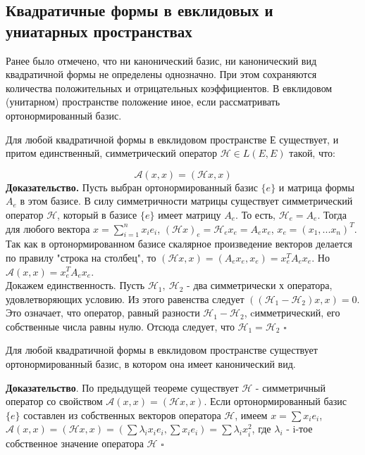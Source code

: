 \subsection{Квадратичные формы в евклидовых и униатарных пространствах}
Ранее было отмечено, что ни канонический базис, ни канонический вид 
квадратичной формы не определены однозначно. При этом сохраняются количества 
положительных и отрицательных коэффициентов. В евклидовом (унитарном) 
пространстве положение иное, если рассматривать ортонормированный базис. 
\begin{theor}
Для любой квадратичной формы в евклидовом пространстве Е существует, и притом
единственный, симметрический оператор $\mathcal H\in L(E,E)$ такой, что:
\end{theor}
$$\mathcal A(x,x)=(\mathcal Hx,x)$$
\textbf{Доказательство.} Пусть выбран ортонормированный базис $\{e\}$ и
матрица формы $A_e$ в этом базисе. В силу
симметричности матрицы существует симметрический оператор $\mathcal H$, 
который в базисе $\{e\}$ имеет матрицу $A_e$. То есть, $\mathcal H_e=A_e$. 
Тогда для любого
вектора $x=\sum\limits_{i=1}^nx_ie_i$, 
$(\mathcal Hx)_e=\mathcal H_ex_e=A_ex_e$,
$x_e=(x_1,...x_n)^T$. Так как в ортонормированном базисе скалярное 
произведение векторов делается по правилу "строка на столбец", то $(\mathcal
Hx,x)=(A_ex_e,x_e)=x_e^TA_ex_e$. Но $\mathcal A(x,x)=x_e^TA_ex_e$. \\
Докажем единственность. Пусть $\mathcal H_1,~\mathcal H_2$ - два симметрически
х оператора, удовлетворяющих условию. Из этого равенства следует $((\mathcal
H_1-\mathcal H_2)x,x)=0$. Это означает, что оператор, равный разности
$\mathcal H_1-\mathcal H_2$, cимметрический, его собственные числа равны нулю.
Отсюда следует, что $\mathcal H_1=\mathcal H_2$ $\square$
\begin{theor}\label{privglavos}
Для любой квадратичной формы в евклидовом пространстве существует 
ортонормированный базис, в котором она имеет канонический вид. 
\end{theor}
\textbf{Доказательство}. По предыдущей теореме существует $\mathcal H$ - 
симметричный оператор со свойством $\mathcal A(x,x)=(\mathcal Hx,x)$. Если
ортонормированный базис $\{e\}$ составлен из собственных векторов оператора
$\mathcal H$, имеем $x=\sum x_ie_i$, $\mathcal A(x,x)=(\mathcal Hx,x)=
(\sum \lambda_ix_ie_i,\sum x_ie_i)=\sum \lambda_ix^2_i$, где $\lambda_i$ -
i-тое собственное значение оператора $\mathcal H$ $\square$


